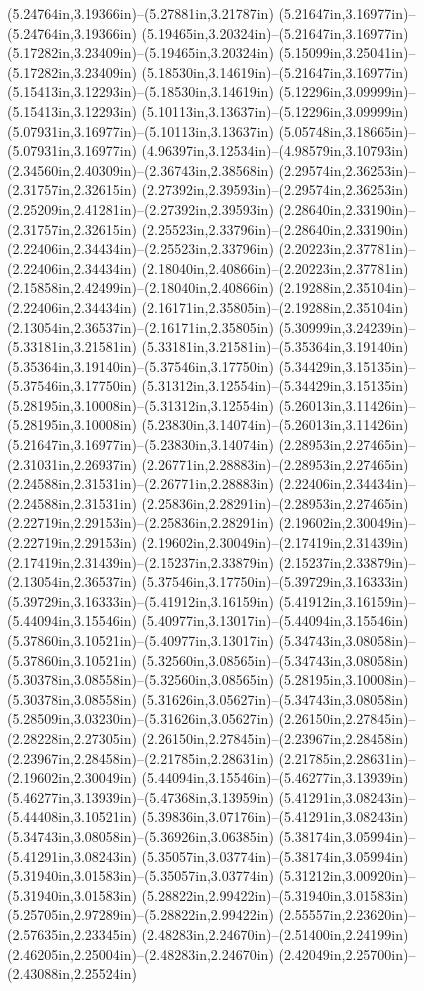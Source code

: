 (5.24764in,3.19366in)--(5.27881in,3.21787in) (5.21647in,3.16977in)--(5.24764in,3.19366in) (5.19465in,3.20324in)--(5.21647in,3.16977in) (5.17282in,3.23409in)--(5.19465in,3.20324in) (5.15099in,3.25041in)--(5.17282in,3.23409in) (5.18530in,3.14619in)--(5.21647in,3.16977in) (5.15413in,3.12293in)--(5.18530in,3.14619in) (5.12296in,3.09999in)--(5.15413in,3.12293in) (5.10113in,3.13637in)--(5.12296in,3.09999in) (5.07931in,3.16977in)--(5.10113in,3.13637in) (5.05748in,3.18665in)--(5.07931in,3.16977in) (4.96397in,3.12534in)--(4.98579in,3.10793in) (2.34560in,2.40309in)--(2.36743in,2.38568in) (2.29574in,2.36253in)--(2.31757in,2.32615in) (2.27392in,2.39593in)--(2.29574in,2.36253in) (2.25209in,2.41281in)--(2.27392in,2.39593in) (2.28640in,2.33190in)--(2.31757in,2.32615in) (2.25523in,2.33796in)--(2.28640in,2.33190in) (2.22406in,2.34434in)--(2.25523in,2.33796in) (2.20223in,2.37781in)--(2.22406in,2.34434in) (2.18040in,2.40866in)--(2.20223in,2.37781in) (2.15858in,2.42499in)--(2.18040in,2.40866in) (2.19288in,2.35104in)--(2.22406in,2.34434in) (2.16171in,2.35805in)--(2.19288in,2.35104in) (2.13054in,2.36537in)--(2.16171in,2.35805in) (5.30999in,3.24239in)--(5.33181in,3.21581in) (5.33181in,3.21581in)--(5.35364in,3.19140in) (5.35364in,3.19140in)--(5.37546in,3.17750in) (5.34429in,3.15135in)--(5.37546in,3.17750in) (5.31312in,3.12554in)--(5.34429in,3.15135in) (5.28195in,3.10008in)--(5.31312in,3.12554in) (5.26013in,3.11426in)--(5.28195in,3.10008in) (5.23830in,3.14074in)--(5.26013in,3.11426in) (5.21647in,3.16977in)--(5.23830in,3.14074in) (2.28953in,2.27465in)--(2.31031in,2.26937in) (2.26771in,2.28883in)--(2.28953in,2.27465in) (2.24588in,2.31531in)--(2.26771in,2.28883in) (2.22406in,2.34434in)--(2.24588in,2.31531in) (2.25836in,2.28291in)--(2.28953in,2.27465in) (2.22719in,2.29153in)--(2.25836in,2.28291in) (2.19602in,2.30049in)--(2.22719in,2.29153in) (2.19602in,2.30049in)--(2.17419in,2.31439in) (2.17419in,2.31439in)--(2.15237in,2.33879in) (2.15237in,2.33879in)--(2.13054in,2.36537in) (5.37546in,3.17750in)--(5.39729in,3.16333in) (5.39729in,3.16333in)--(5.41912in,3.16159in) (5.41912in,3.16159in)--(5.44094in,3.15546in) (5.40977in,3.13017in)--(5.44094in,3.15546in) (5.37860in,3.10521in)--(5.40977in,3.13017in) (5.34743in,3.08058in)--(5.37860in,3.10521in) (5.32560in,3.08565in)--(5.34743in,3.08058in) (5.30378in,3.08558in)--(5.32560in,3.08565in) (5.28195in,3.10008in)--(5.30378in,3.08558in) (5.31626in,3.05627in)--(5.34743in,3.08058in) (5.28509in,3.03230in)--(5.31626in,3.05627in) (2.26150in,2.27845in)--(2.28228in,2.27305in) (2.26150in,2.27845in)--(2.23967in,2.28458in) (2.23967in,2.28458in)--(2.21785in,2.28631in) (2.21785in,2.28631in)--(2.19602in,2.30049in) (5.44094in,3.15546in)--(5.46277in,3.13939in) (5.46277in,3.13939in)--(5.47368in,3.13959in) (5.41291in,3.08243in)--(5.44408in,3.10521in) (5.39836in,3.07176in)--(5.41291in,3.08243in) (5.34743in,3.08058in)--(5.36926in,3.06385in) (5.38174in,3.05994in)--(5.41291in,3.08243in) (5.35057in,3.03774in)--(5.38174in,3.05994in) (5.31940in,3.01583in)--(5.35057in,3.03774in) (5.31212in,3.00920in)--(5.31940in,3.01583in) (5.28822in,2.99422in)--(5.31940in,3.01583in) (5.25705in,2.97289in)--(5.28822in,2.99422in) (2.55557in,2.23620in)--(2.57635in,2.23345in) (2.48283in,2.24670in)--(2.51400in,2.24199in) (2.46205in,2.25004in)--(2.48283in,2.24670in) (2.42049in,2.25700in)--(2.43088in,2.25524in) 